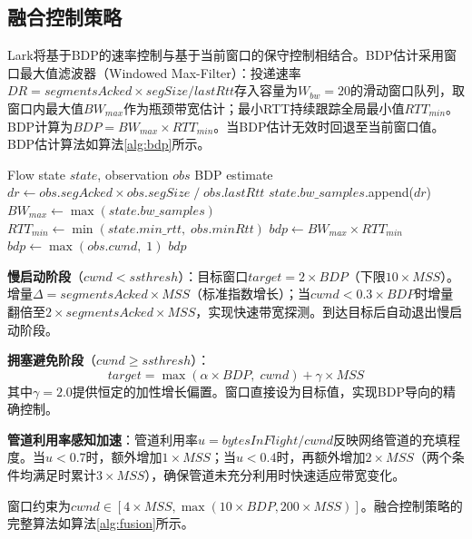\documentclass[10pt,twocolumn]{article}
\begin{document}
\subsection{融合控制策略}

Lark将基于BDP的速率控制与基于当前窗口的保守控制相结合。BDP估计采用窗口最大值滤波器（Windowed Max-Filter）：投递速率$DR = segmentsAcked \times segSize / lastRtt$存入容量为$W_{bw}=20$的滑动窗口队列，取窗口内最大值$BW_{max}$作为瓶颈带宽估计；最小RTT持续跟踪全局最小值$RTT_{min}$。BDP计算为$BDP = BW_{max} \times RTT_{min}$。当BDP估计无效时回退至当前窗口值。BDP估计算法如算法\ref{alg:bdp}所示。

\begin{algorithm}[htbp]
\caption{Windowed Max-Filter BDP Estimation}
\label{alg:bdp}
\small
\begin{algorithmic}[1]
\REQUIRE Flow state $state$, observation $obs$
\ENSURE BDP estimate
\STATE $dr \leftarrow obs.segAcked \times obs.segSize \;/\; obs.lastRtt$
\STATE $state.bw\_samples$.append($dr$) 
\STATE $BW_{max} \leftarrow \max(state.bw\_samples)$
\STATE $RTT_{min} \leftarrow \min(state.min\_rtt, \; obs.minRtt)$
\STATE $bdp \leftarrow BW_{max} \times RTT_{min}$
    \STATE $bdp \leftarrow \max(obs.cwnd, \; 1)$ 
\ENDIF
\RETURN $bdp$
\end{algorithmic}
\end{algorithm}

\textbf{慢启动阶段}（$cwnd < ssthresh$）：目标窗口$target = 2 \times BDP$（下限$10 \times MSS$）。增量$\Delta = segmentsAcked \times MSS$（标准指数增长）；当$cwnd < 0.3 \times BDP$时增量翻倍至$2 \times segmentsAcked \times MSS$，实现快速带宽探测。到达目标后自动退出慢启动阶段。

\textbf{拥塞避免阶段}（$cwnd \geq ssthresh$）：
\begin{equation}
target = \max(\alpha \times BDP, \; cwnd) + \gamma \times MSS
\end{equation}
其中$\gamma=2.0$提供恒定的加性增长偏置。窗口直接设为目标值，实现BDP导向的精确控制。

\textbf{管道利用率感知加速}：管道利用率$u = bytesInFlight / cwnd$反映网络管道的充填程度。当$u < 0.7$时，额外增加$1 \times MSS$；当$u < 0.4$时，再额外增加$2 \times MSS$（两个条件均满足时累计$3 \times MSS$），确保管道未充分利用时快速适应带宽变化。

窗口约束为$cwnd \in [4 \times MSS, \max(10 \times BDP, 200 \times MSS)]$。融合控制策略的完整算法如算法\ref{alg:fusion}所示。
\end{document}
